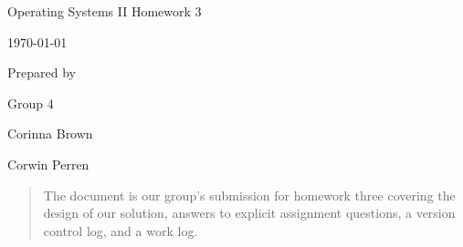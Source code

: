 \documentclass[onecolumn, draftclsnofoot, 10pt, compsoc]{IEEEtran}
\newcommand{\NameSigPair}[1]{
  \par
  \makebox[2.75in][r]{#1} 
  \hfill
  \makebox[3.25in]{
      \makebox[2.25in]{\hrulefill} 
      \hfill
      \makebox[.75in]{\hrulefill}
  }
  \par\vspace{-12pt} 
  \textit{
      \tiny\noindent
      \makebox[2.75in]{} 
      \hfill
      \makebox[3.25in]{
          \makebox[2.25in][r]{Signature} 
          \hfill
          \makebox[.75in][r]{Date}
      }
  }
}
\renewcommand{\NameSigPair}[1]{#1}
\begin{document}
\begin{titlepage}
	\begin{singlespace}
		\par\vspace{2in}
		\centering
		\scshape{
			\huge Operating Systems II Homework 3 \par
			{\large\today}\par
			\vspace{.5in}
			\vfill
			\vspace{5pt}
			{\large Prepared by }\par
			Group 4 \par
			\vspace{5pt}
			{\Large
				\NameSigPair{Corinna Brown}\par
				\NameSigPair{Corwin Perren}\par
			}
			\vspace{20pt}
            \begin{abstract}
            The document is our group's submission for homework three covering the design of our solution, answers to explicit assignment questions, a version control log, and a work log.
			\end{abstract}
		}
	\end{singlespace}
\end{titlepage}
\newpage
{}
\tableofcontents
\clearpage





\end{document}
